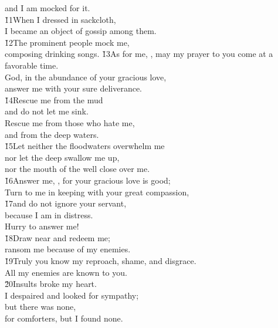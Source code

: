 \begin{poetry}
\poemll    and I am mocked for it. \\
\poeml \v{11}When I dressed in sackcloth, \\
\poemll    I became an object of gossip among them. \\
\poeml \v{12}The prominent people mock me, \\
\poemll    composing drinking songs.
\poeml \v{13}As for me, , may my prayer to you come at a favorable time. \\
\poemll    God, in the abundance of your gracious love, \\
\poemlll       answer me with your sure deliverance. \\
\poeml \v{14}Rescue me from the mud \\
\poemll    and do not let me sink. \\
\poeml Rescue me from those who hate me, \\
\poemll    and from the deep waters. \\
\poeml \v{15}Let neither the floodwaters overwhelm me \\
\poemll    nor let the deep swallow me up, \\
\poemlll       nor the mouth of the well close over me. \\
\poeml \v{16}Answer me, , for your gracious love is good; \\
\poemll    Turn to me in keeping with your great compassion, \\
\poeml \v{17}and do not ignore your servant, \\
\poemll    because I am in distress. \\
\poemlll       Hurry to answer me! \\
\poeml \v{18}Draw near and redeem me; \\
\poemll    ransom me because of my enemies. \\
\poeml \v{19}Truly you know my reproach, shame, and disgrace. \\
\poemll    All my enemies are known to you. \\
\poeml \v{20}Insults broke my heart. \\
\poemll    I despaired and looked for sympathy; \\
\poeml but there was none, \\
\poemll    for comforters, but I found none. \\

\end{poetry}
